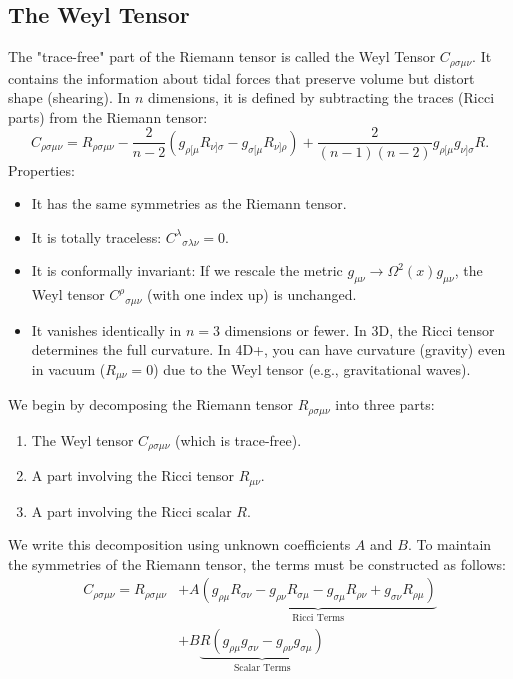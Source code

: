 \documentclass[11pt, a4paper]{report}
\begin{document}
\subsection*{The Weyl Tensor}
The "trace-free" part of the Riemann tensor is called the Weyl Tensor \(C_{\rho\sigma\mu\nu}\). It contains the information about tidal forces that preserve volume but distort shape (shearing).
In \(n\) dimensions, it is defined by subtracting the traces (Ricci parts) from the Riemann tensor:
\begin{equation}
C_{\rho\sigma\mu\nu} = R_{\rho\sigma\mu\nu} - \frac{2}{n-2} (g_{\rho[\mu} R_{\nu]\sigma} - g_{\sigma[\mu} R_{\nu]\rho}) + \frac{2}{(n-1)(n-2)} g_{\rho[\mu} g_{\nu]\sigma} R.
\end{equation}
Properties:
\begin{itemize}
    \item It has the same symmetries as the Riemann tensor.
    \item It is totally traceless: \({C^\lambda}_{\sigma\lambda\nu} = 0\).
    \item It is conformally invariant: If we rescale the metric \(g_{\mu\nu} \to \Omega^2(x) g_{\mu\nu}\), the Weyl tensor \({C^\rho}_{\sigma\mu\nu}\) (with one index up) is unchanged.
    \item It vanishes identically in \(n=3\) dimensions or fewer. In 3D, the Ricci tensor determines the full curvature. In 4D+, you can have curvature (gravity) even in vacuum (\(R_{\mu\nu}=0\)) due to the Weyl tensor (e.g., gravitational waves).
\end{itemize}
We begin by decomposing the Riemann tensor $R_{\rho\sigma\mu\nu}$ into three parts:
\begin{enumerate}
    \item The Weyl tensor $C_{\rho\sigma\mu\nu}$ (which is trace-free).
    \item A part involving the Ricci tensor $R_{\mu\nu}$.
    \item A part involving the Ricci scalar $R$.
\end{enumerate}

We write this decomposition using unknown coefficients $A$ and $B$. To maintain the symmetries of the Riemann tensor, the terms must be constructed as follows:
\begin{align}
    C_{\rho\sigma\mu\nu} = R_{\rho\sigma\mu\nu} 
    &+ A \underbrace{(g_{\rho\mu} R_{\sigma\nu} - g_{\rho\nu} R_{\sigma\mu} - g_{\sigma\mu} R_{\rho\nu} + g_{\sigma\nu} R_{\rho\mu})}_{\text{Ricci Terms}} \nonumber \\
    &+ B \underbrace{R (g_{\rho\mu} g_{\sigma\nu} - g_{\rho\nu} g_{\sigma\mu})}_{\text{Scalar Terms}} \label{eq:ansatz}
\end{align}
\end{document}
